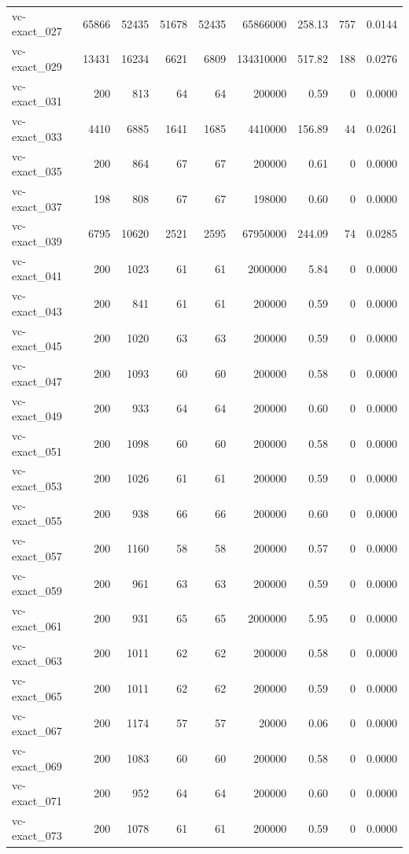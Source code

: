 {\begin{longtable}{lrrrrrrrr}
vc-exact\_027 & 65866 & 52435 & 51678 & 52435 & 65866000 & 258.13 & 757 & 0.0144 \\
vc-exact\_029 & 13431 & 16234 & 6621 & 6809 & 134310000 & 517.82 & 188 & 0.0276 \\
vc-exact\_031 & 200 & 813 & 64 & 64 & 200000 & 0.59 & 0 & 0.0000 \\
vc-exact\_033 & 4410 & 6885 & 1641 & 1685 & 4410000 & 156.89 & 44 & 0.0261 \\
vc-exact\_035 & 200 & 864 & 67 & 67 & 200000 & 0.61 & 0 & 0.0000 \\
vc-exact\_037 & 198 & 808 & 67 & 67 & 198000 & 0.60 & 0 & 0.0000 \\
vc-exact\_039 & 6795 & 10620 & 2521 & 2595 & 67950000 & 244.09 & 74 & 0.0285 \\
vc-exact\_041 & 200 & 1023 & 61 & 61 & 2000000 & 5.84 & 0 & 0.0000 \\
vc-exact\_043 & 200 & 841 & 61 & 61 & 200000 & 0.59 & 0 & 0.0000 \\
vc-exact\_045 & 200 & 1020 & 63 & 63 & 200000 & 0.59 & 0 & 0.0000 \\
vc-exact\_047 & 200 & 1093 & 60 & 60 & 200000 & 0.58 & 0 & 0.0000 \\
vc-exact\_049 & 200 & 933 & 64 & 64 & 200000 & 0.60 & 0 & 0.0000 \\
vc-exact\_051 & 200 & 1098 & 60 & 60 & 200000 & 0.58 & 0 & 0.0000 \\
vc-exact\_053 & 200 & 1026 & 61 & 61 & 200000 & 0.59 & 0 & 0.0000 \\
vc-exact\_055 & 200 & 938 & 66 & 66 & 200000 & 0.60 & 0 & 0.0000 \\
vc-exact\_057 & 200 & 1160 & 58 & 58 & 200000 & 0.57 & 0 & 0.0000 \\
vc-exact\_059 & 200 & 961 & 63 & 63 & 200000 & 0.59 & 0 & 0.0000 \\
vc-exact\_061 & 200 & 931 & 65 & 65 & 2000000 & 5.95 & 0 & 0.0000 \\
vc-exact\_063 & 200 & 1011 & 62 & 62 & 200000 & 0.58 & 0 & 0.0000 \\
vc-exact\_065 & 200 & 1011 & 62 & 62 & 200000 & 0.59 & 0 & 0.0000 \\
vc-exact\_067 & 200 & 1174 & 57 & 57 & 20000 & 0.06 & 0 & 0.0000 \\
vc-exact\_069 & 200 & 1083 & 60 & 60 & 200000 & 0.58 & 0 & 0.0000 \\
vc-exact\_071 & 200 & 952 & 64 & 64 & 200000 & 0.60 & 0 & 0.0000 \\
vc-exact\_073 & 200 & 1078 & 61 & 61 & 200000 & 0.59 & 0 & 0.0000 \\

\end{longtable}}
